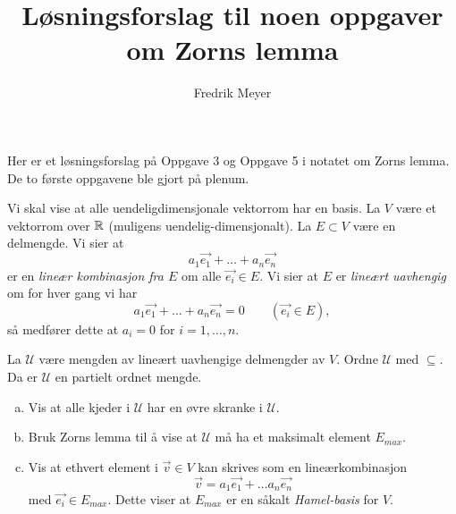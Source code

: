 \documentclass[11pt, norsk]{article}
\title{Løsningsforslag til noen oppgaver om Zorns lemma}
\author{Fredrik Meyer}
\date{}
\begin{document}
\maketitle

Her er et løsningsforslag på Oppgave 3 og Oppgave 5 i notatet om Zorns lemma. De to første oppgavene ble gjort på plenum.

\begin{oppg}
  Vi skal vise at alle uendeligdimensjonale vektorrom har en basis. La $V$ være et vektorrom over $\mathbb{R}$ (muligens uendelig-dimensjonalt). La $E \subset V$ være en delmengde. Vi sier at
$$
a_1\vec {e_1} +\ldots+a_n\vec{e_n}
$$
er en \emph{lineær kombinasjon fra $E$} om alle $\vec {e_i} \in E$. Vi sier at $E$ er \emph{lineært uavhengig} om for hver gang vi har
$$
a_1 \vec{e_1} + \ldots + a_n \vec{e_n} = 0 \qquad (\vec{e_i} \in E),
$$
så medfører dette at $a_i=0$ for $i=1,\ldots,n$.

La $\mathscr U$ være mengden av lineært uavhengige delmengder av $V$. Ordne $\mathscr U$ med $\subseteq$. Da er $\mathscr U$ en partielt ordnet mengde.
\begin{enumerate}[a)]
\item Vis at alle kjeder i $\mathscr U$ har en øvre skranke i $\mathscr U$.
\item Bruk Zorns lemma til å vise at $\mathscr U$ må ha et maksimalt element $E_{max}$.
\item Vis at ethvert element i $\vec v \in V$ kan skrives som en lineærkombinasjon 
$$
\vec v = a_1\vec {e_1} + \ldots a_n \vec {e_n}
$$
med $\vec {e_i} \in E_{max}$. Dette viser at $E_{max}$ er en såkalt \emph{Hamel-basis} for $V$.
\end{enumerate}
\end{oppg}
\end{document}
